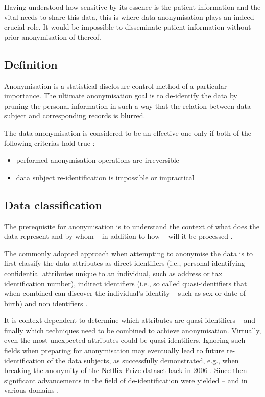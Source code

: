 \documentclass[a4paper,twoside,12pt]{book}
\begin{document}
Having understood how sensitive by its essence is the patient information and the vital needs to share this data, this is where data anonymisation plays an indeed crucial role. It would be impossible to disseminate patient information without prior anonymisation of thereof.

\subsection{Definition}

Anonymisation is a statistical disclosure control method of a particular importance. The ultimate anonymisation goal is to de-identify the data by pruning the personal information in such a way that the relation between data subject and corresponding records is blurred.

The data anonymisation is considered to be an effective one only if both of the following criterias hold true \cite{bib:anonymization_taxa}:
\begin{itemize}
\item performed anonymisation operations are irreversible
\item data subject re-identification is impossible or impractical 
\end{itemize}

\subsection{Data classification}

The prerequisite for anonymisation is to understand the context of what does the data represent and by whom – in addition to how – will it be processed \cite{bib:anonymizing_health_data}. 

The commonly adopted approach when attempting to anonymise the data is to first classify the data attributes as direct identifiers (i.e., personal identifying confidential attributes unique to an individual, such as address or tax identification number), indirect identifiers (i.e., so called quasi-identifiers that when combined can discover the individual's identity – such as sex or date of birth) and non identifiers \cite{bib:privacy_unesco_bigdata,bib:anonymizing_health_data}.

It is context dependent to determine which attributes are quasi-identifiers – and finally which techniques need to be combined to achieve anonymisation. Virtually, even the most unexpected attributes could be quasi-identifiers. Ignoring such fields when preparing for anonymisation may eventually lead to future re-identification of the data subjects, as successfully demonstrated, e.g., when breaking the anonymity of the Netflix Prize dataset back in 2006 \cite{bib:netflix}. Since then significant advancements in the field of de-identification were yielded – and in various domains \cite{bib:netflix_decade_later}.
\end{document}
